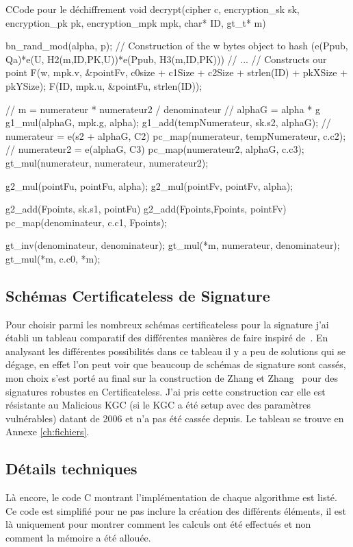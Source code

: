 \begin{sourcebox}{C}{Code pour le déchiffrement}
	void decrypt(cipher c, encryption_sk sk, encryption_pk pk, encryption_mpk  mpk, char* ID, gt_t* m){
		bn_rand_mod(alpha, p);
		// Construction of the w bytes object to hash (e(Ppub, Qa)*e(U, H2(m,ID,PK,U))*e(Ppub, H3(m,ID,PK)))
		// ...
		// Constructs our point
		F(w, mpk.v, &pointFv, c0size + c1Size + c2Size + strlen(ID) + pkXSize + pkYSize);
		F(ID, mpk.u, &pointFu, strlen(ID));
		
		// m = numerateur * numerateur2 / denominateur
		// alphaG = alpha * g
		g1_mul(alphaG, mpk.g, alpha);
		g1_add(tempNumerateur, sk.s2, alphaG);
		// numerateur = e(s2 + alphaG, C2)
		pc_map(numerateur, tempNumerateur, c.c2);
		// numerateur2 = e(alphaG, C3)
		pc_map(numerateur2, alphaG, c.c3);
		gt_mul(numerateur, numerateur, numerateur2);
		
		g2_mul(pointFu, pointFu, alpha);
		g2_mul(pointFv, pointFv, alpha);
		
		g2_add(Fpoints, sk.s1, pointFu)
		g2_add(Fpoints,Fpoints, pointFv)
		pc_map(denominateur, c.c1, Fpoints);
		
		gt_inv(denominateur, denominateur);
		gt_mul(*m, numerateur, denominateur);
		gt_mul(*m, c.c0, *m);
	}
\end{sourcebox}

\subsection{Schémas Certificateless de Signature}
Pour choisir parmi les nombreux schémas certificateless pour la signature j'ai établi un tableau comparatif des différentes manières de faire inspiré de~\cite{bookIntroCertificateless}. En analysant les différentes possibilités dans ce tableau il y a peu de solutions qui se dégage, en effet l'on peut voir que beaucoup de schémas de signature sont cassés, mon choix s'est porté au final sur la construction de Zhang et Zhang~\cite{DBLP:conf/acns/ZhangWXF06} pour des signatures robustes en Certificateless. J'ai pris cette construction car elle est résistante au Malicious KGC (si le KGC a été setup avec des paramètres vulnérables) datant de 2006 et n'a pas été cassée depuis. Le tableau se trouve en Annexe \ref{ch:fichiers}.
\subsection{Détails techniques}
 Là encore, le code C montrant l'implémentation de chaque algorithme est listé. Ce code est simplifié pour ne pas inclure la création des différents éléments, il est là uniquement pour montrer comment les calculs ont été effectués et non comment la mémoire a été allouée.
 
